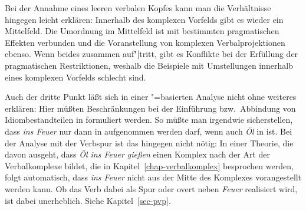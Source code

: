 Bei der Annahme eines leeren verbalen Kopfes kann man die Verhältnisse hingegen leicht erklären:
Innerhalb des komplexen Vorfelds gibt es wieder ein Mittelfeld.
Die Umordnung im Mittelfeld ist mit bestimmten pragmatischen Effekten verbunden und die Voranstellung
von komplexen Verbalprojektionen ebenso. Wenn beides zusammen auf"|tritt, gibt es Konflikte bei der
Erfüllung der pragmatischen Restriktionen, weshalb die Beispiele mit Umstellungen innerhalb eines
komplexen Vorfelds schlecht sind.

Auch der dritte Punkt läßt sich in einer \slasch"=basierten Analyse nicht ohne weiteres erklären:
Hier müßten Beschränkungen bei der Einführung bzw.\ Abbindung von Idiombestandteilen
in \slasch formuliert werden. So müßte man \zb irgendwie sicherstellen, dass \emph{ins Feuer} nur
dann in \slasch aufgenommen werden darf, wenn auch \emph{Öl} in \slasch ist.
Bei der Analyse mit der Verbspur ist das hingegen nicht nötig: In einer Theorie, die davon ausgeht, dass
\emph{Öl ins Feuer gießen} einen Komplex nach der Art der Verbalkomplexe bildet, die in
Kapitel~\ref{chap-verbalkomplex} besprochen werden, folgt automatisch, dass \emph{ins Feuer} nicht
aus der Mitte des Komplexes vorangestellt werden kann. Ob das Verb dabei als Spur oder overt neben
\emph{Feuer} realisiert wird, ist dabei unerheblich. Siehe Kapitel~\ref{sec-pvp}.



